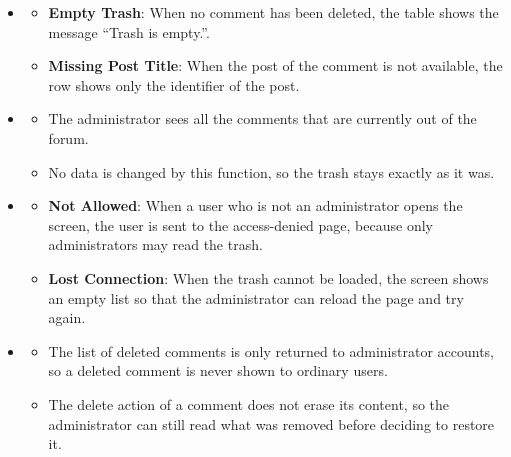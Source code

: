 \begin{itemize}[leftmargin=1.6em,topsep=4pt,itemsep=3pt,parsep=0pt,label=$\bullet$]
\begin{itemize}[leftmargin=2.2em,topsep=2pt,itemsep=3pt,parsep=0pt,label=$\circ$]
            \item \textbf{Choose a Comment}: The user opens a comment with the view button, or restores it with the restore button in the row (see \textbf{View Deleted Comment Details} and \textbf{Restore Deleted Comment}).
        \end{itemize}
    \item {}
        \begin{itemize}[leftmargin=2.2em,topsep=2pt,itemsep=3pt,parsep=0pt,label=$\circ$]
            \item \textbf{Empty Trash}: When no comment has been deleted, the table shows the message ``Trash is empty.''.
            \item \textbf{Missing Post Title}: When the post of the comment is not available, the row shows only the identifier of the post.
        \end{itemize}
    \item {}
        \begin{itemize}[leftmargin=2.2em,topsep=2pt,itemsep=3pt,parsep=0pt,label=$\circ$]
            \item The administrator sees all the comments that are currently out of the forum.
            \item No data is changed by this function, so the trash stays exactly as it was.
        \end{itemize}
    \item {}
        \begin{itemize}[leftmargin=2.2em,topsep=2pt,itemsep=3pt,parsep=0pt,label=$\circ$]
            \item \textbf{Not Allowed}: When a user who is not an administrator opens the screen, the user is sent to the access-denied page, because only administrators may read the trash.
            \item \textbf{Lost Connection}: When the trash cannot be loaded, the screen shows an empty list so that the administrator can reload the page and try again.
        \end{itemize}
    \item {}
        \begin{itemize}[leftmargin=2.2em,topsep=2pt,itemsep=3pt,parsep=0pt,label=$\circ$]
            \item The list of deleted comments is only returned to administrator accounts, so a deleted comment is never shown to ordinary users.
            \item The delete action of a comment does not erase its content, so the administrator can still read what was removed before deciding to restore it.
        \end{itemize}
\end{itemize}

